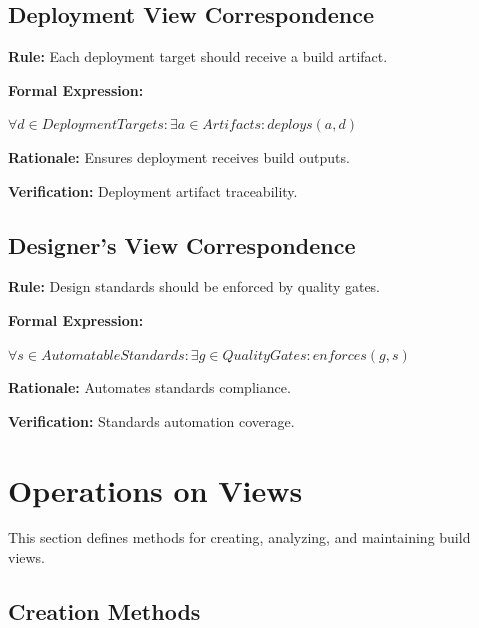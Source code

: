 \documentclass[11pt,letterpaper]{article}
\begin{document}
\subsection{Deployment View Correspondence}

\begin{definitionbox}
\textbf{Rule:} Each deployment target should receive a build artifact.

\textbf{Formal Expression:}
\begin{center}
$\forall d \in DeploymentTargets : \exists a \in Artifacts : deploys(a, d)$
\end{center}

\textbf{Rationale:} Ensures deployment receives build outputs.

\textbf{Verification:} Deployment artifact traceability.
\end{definitionbox}

\subsection{Designer's View Correspondence}

\begin{definitionbox}
\textbf{Rule:} Design standards should be enforced by quality gates.

\textbf{Formal Expression:}
\begin{center}
$\forall s \in AutomatableStandards : \exists g \in QualityGates : enforces(g, s)$
\end{center}

\textbf{Rationale:} Automates standards compliance.

\textbf{Verification:} Standards automation coverage.
\end{definitionbox}

\section{Operations on Views}

This section defines methods for creating, analyzing, and maintaining build views.

\subsection{Creation Methods}
\end{document}
